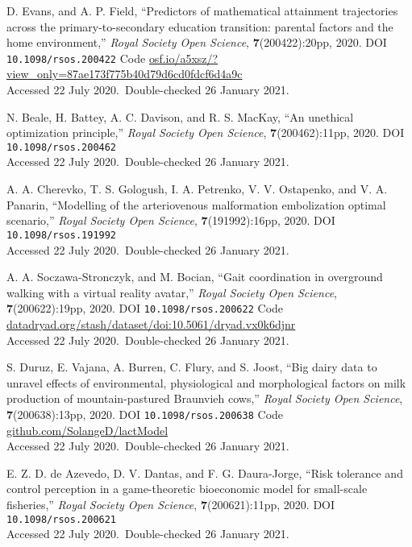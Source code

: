 \vbox{
{\sc D. Evans, and A. P. Field}, ``Predictors of mathematical attainment trajectories across the primary-to-secondary education transition: parental factors and the home environment,'' \emph{Royal Society Open Science}, \textbf{7}(200422):20pp, 2020. DOI \texttt{10.1098/rsos.200422} {Code \url{osf.io/a5xsz/?view_only=87ae173f775b40d79d6cd0fdcf6d4a9c}}\\\hfill{Accessed 22 July 2020.}\ {Double-checked 26 January 2021}.}\bibskip

\vbox{
{\sc N. Beale, H. Battey, A. C. Davison, and R. S. MacKay}, ``An unethical optimization principle,'' \emph{Royal Society Open Science}, \textbf{7}(200462):11pp, 2020. DOI \texttt{10.1098/rsos.200462}\\\hfill{Accessed 22 July 2020.}\ {Double-checked 26 January 2021}.}\bibskip

\vbox{
{\sc A. A. Cherevko, T. S. Gologush, I. A. Petrenko, V. V. Ostapenko, and V. A. Panarin}, ``Modelling of the arteriovenous malformation embolization optimal scenario,'' \emph{Royal Society Open Science}, \textbf{7}(191992):16pp, 2020. DOI \texttt{10.1098/rsos.191992}\\\hfill{Accessed 22 July 2020.}\ {Double-checked 26 January 2021}.}\bibskip

\vbox{
{\sc A. A. Soczawa-Stronczyk, and M. Bocian}, ``Gait coordination in overground walking with a virtual reality avatar,'' \emph{Royal Society Open Science}, \textbf{7}(200622):19pp, 2020. DOI \texttt{10.1098/rsos.200622} {Code \url{datadryad.org/stash/dataset/doi:10.5061/dryad.vx0k6djnr}}\\\hfill{Accessed 22 July 2020.}\ {Double-checked 26 January 2021}.}\bibskip

\vbox{
{\sc S. Duruz, E. Vajana, A. Burren, C. Flury, and S. Joost}, ``Big dairy data to unravel effects of environmental, physiological and morphological factors on milk production of mountain-pastured Braunvieh cows,'' \emph{Royal Society Open Science}, \textbf{7}(200638):13pp, 2020. DOI \texttt{10.1098/rsos.200638} {Code \url{github.com/SolangeD/lactModel}}\\\hfill{Accessed 22 July 2020.}\ {Double-checked 26 January 2021}.}\bibskip

\vbox{
{\sc E. Z. D. de Azevedo, D. V. Dantas, and F. G. Daura-Jorge}, ``Risk tolerance and control perception in a game-theoretic bioeconomic model for small-scale fisheries,'' \emph{Royal Society Open Science}, \textbf{7}(200621):11pp, 2020. DOI \texttt{10.1098/rsos.200621}\\\hfill{Accessed 22 July 2020.}\ {Double-checked 26 January 2021}.}\bibskip

